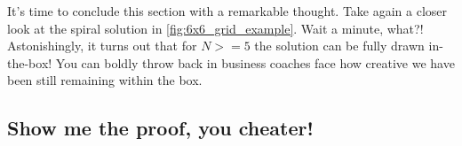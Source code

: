 \documentclass[11pt]{article}
\newtheorem{lemma}[theorem]{Lemma}
\begin{document}
It's time to conclude this section with a remarkable thought. Take again a closer look at the spiral solution in \autoref{fig:6x6_grid_example}. Wait a minute, what?! Astonishingly, it turns out that for $N >= 5$ the solution can be fully drawn in-the-box!
You can boldly throw back in business coaches face how creative we have been still remaining within the box.


\hypertarget{proof-extended-solution} {
	\subsection{Show me the proof, you cheater!}
	\label{proof-extended-solution}
}

\end{document}
